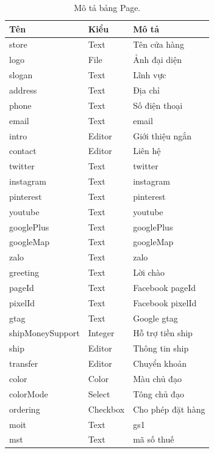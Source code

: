\documentclass[11pt]{report}
\begin{document}
	
	\begin{table}[h!]
		\begin{center}
			\caption{Mô tả bảng Page.}
			\begin{tabular}{ |l|l|l| } 
				\hline
				Tên & Kiểu & Mô tả \\
				\hline
				store & Text & Tên cửa hàng \\
				logo & File & Ảnh đại diện \\
				slogan & Text & Lĩnh vực \\
				address & Text & Địa chỉ \\
				phone & Text & Số điện thoại \\
				email & Text & email \\
				intro & Editor & Giới thiệu ngắn \\
				contact & Editor & Liên hệ \\
				twitter & Text & twitter \\
				instagram & Text & instagram \\
				pinterest & Text & pinterest \\
				youtube & Text & youtube \\
				googlePlus & Text & googlePlus \\
				googleMap & Text & googleMap \\
				zalo & Text & zalo \\
				greeting & Text & Lời chào \\
				pageId & Text & Facebook pageId \\
				pixelId & Text & Facebook pixelId \\
				gtag & Text & Google gtag \\
				shipMoneySupport & Integer & Hỗ trợ tiền ship \\
				ship & Editor & Thông tin ship \\
				transfer & Editor & Chuyển khoản \\
				color & Color & Màu chủ đạo \\
				colorMode & Select & Tông chủ đạo \\
				ordering & Checkbox & Cho phép đặt hàng \\
				moit & Text & gs1 \\
				mst & Text & mã số thuế \\
				
				
				\hline
			\end{tabular}
			\label{table:Page}
		\end{center}
	\end{table}
	
\end{document}
